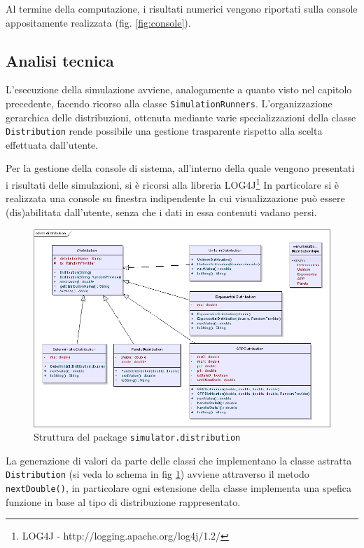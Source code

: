 Al termine della computazione, i risultati numerici vengono riportati sulla console appositamente realizzata (fig. \ref{fig:console}).


\subsection{Analisi tecnica}

L'esecuzione della simulazione avviene, analogamente a quanto visto nel capitolo precedente, facendo ricorso alla classe {\tt SimulationRunners}. L'organizzazione gerarchica delle distribuzioni, ottenuta mediante varie specializzazioni della classe {\tt Distribution} rende possibile una gestione trasparente rispetto alla scelta effettuata dall'utente.

Per la gestione della console di sistema, all'interno della quale vengono presentati i risultati delle simulazioni, si \`e ricorsi alla libreria LOG4J\footnote{LOG4J - http://logging.apache.org/log4j/1.2/}
In particolare si \`e realizzata una console su finestra indipendente la cui visualizzazione pu\`o essere (dis)abilitata dall'utente, senza che i dati in essa contenuti vadano persi.

\begin{figure}[!h]{
	\begin{center}
	   \includegraphics[width=\textwidth]{figures/distributionclass.png}
	\end{center}}
	\caption{Struttura del package {\tt simulator.distribution}}
	\label{fig:distuml}
\end{figure}

La generazione di valori da parte delle classi che implementano la classe astratta {\tt Distribution} (si veda lo schema in fig \ref{fig:distuml}) avviene attraverso il metodo {\tt nextDouble()}, in particolare ogni estensione della classe implementa una spefica funzione in base al tipo di distribuzione rappresentato.


